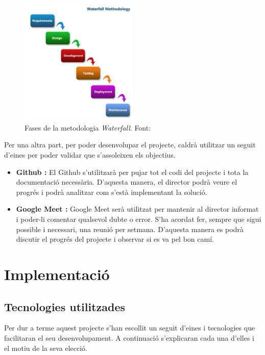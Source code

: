 \documentclass[a4paper]{article}
\begin{document}
\begin{figure}[H]
    \centering
    \includegraphics[width=0.5\textwidth]{images/Waterfall-Metodology.png}
    \caption{Fases de la metodologia \textit{Waterfall}. Font: \cite{waterfallImage}}
    \label{fig:WaterfallImage}
\end{figure}

Per una altra part, per poder desenvolupar el projecte, caldrà utilitzar un seguit d'eines per poder validar que s'assoleixen els objectius. 

\begin{itemize}
    \item \textbf{Github \cite{Github}:} El Github s'utilitzarà per pujar tot el codi del projecte i tota la documentació necessària. D'aquesta manera, el director podrà veure el progrés i podrà analitzar com s'està implementant la solució.
    
    \item \textbf{Google Meet \cite{GoogleMeet}:} Google Meet serà utilitzat per mantenir al director informat i poder-li comentar qualsevol dubte o error. S'ha acordat fer, sempre que sigui possible i necessari, una reunió per setmana. D'aquesta manera es podrà discutir el progrés del projecte i observar si es va pel bon camí.
\end{itemize}

\newpage
\section{Implementació}
\subsection{Tecnologies utilitzades}
Per dur a terme aquest projecte s'han escollit un seguit d'eines i tecnologies que facilitaran el seu desenvolupament. A continuació s'explicaran cada una d'elles i el motiu de la seva elecció.
\end{document}
